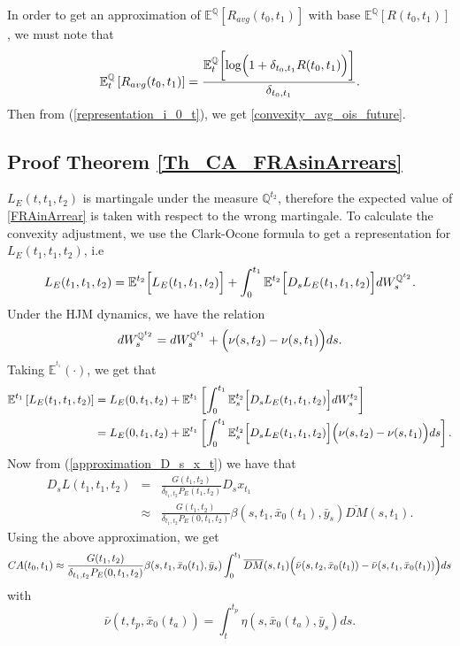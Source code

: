 \documentclass[a4paper,10pt]{article}
\newcommand{\1}{\mathbf{1}}
\begin{document}
In order to get an approximation of $\mathbb{E}^{\mathbb{Q}}\left[R_{avg}(t_0,t_1)\right]$ with base $\mathbb{E}^{\mathbb{Q}}\left[R(t_0,t_1)\right]$, we must note that 
\begin{equation*}
\mathbb{E}_t^{\mathbb{Q}}\left[R_{avg}(t_0,t_1)\right] = \frac{\mathbb{E}_t^{\mathbb{Q}}\biggl[ \log\Bigl(1+ \delta_{t_0,t_1} R(t_0,t_1)\Bigr)\biggr]}{ \delta_{t_0,t_1}}.
\end{equation*}
Then from (\ref{representation_i_0_t}), we get \eqref{convexity_avg_ois_future}.

\subsection{Proof Theorem \ref{Th_CA_FRAsinArrears}}\label{Proof_CA_FRAsinArrears}
$L_{E}(t,t_1,t_2)$ is martingale under the measure $\mathbb{Q}^{t_2}$, therefore the expected value of \eqref{FRAinArrear} is taken with respect to the wrong martingale. To calculate the convexity adjustment, we use the Clark-Ocone formula to get a representation for $L_{E}(t_1,t_1,t_2)$, i.e
\begin{equation}\label{general_convexity_fras}
L_{E}(t_1,t_1,t_2) = \mathbb{E}^{t_2}\Bigl[L_{E}(t_1,t_1,t_2) \Bigr] + \int_{0}^{t_1} \mathbb{E}^{t_2}\Bigl[D_s L_{E}(t_1,t_1,t_2) \Bigr] dW^{\mathbb{Q}^{t_2}}_{s}.
\end{equation}
Under the HJM dynamics, we have the relation
\begin{equation*}
dW^{\mathbb{Q}^{t_2}}_s = dW^{\mathbb{Q}^{t_1}}_s + \Bigl(\nu(s,t_2) - \nu(s,t_1)\Bigr) ds. 
\end{equation*}
Taking $\mathbb{E}^{^{t_1}}(\cdot)$, we get that
\begin{align*}
\mathbb{E}^{t_1}\left[L_{E}(t_1,t_1,t_2) \right] &= L_{E}(0,t_1,t_2) + \mathbb{E}^{t_1}\left[ \int_{0}^{t_1} \mathbb{E}_s^{t_2}\Bigl[D_s L_{E}(t_1,t_1,t_2)\Bigr] dW^{t_2}_{s}\right]\\
&= L_{E}(0,t_1,t_2) + \mathbb{E}^{t_1}\left[ \int_{0}^{t_1} \mathbb{E}_s^{t_2}\Bigl[D_s L_{E}(t_1,t_1,t_2) \Bigr] \Bigl(\nu(s,t_2)-\nu(s,t_1)\Bigr) ds \right].
\end{align*}
Now from (\ref{approximation_D_s_x_t}) we have that 
\begin{eqnarray*}
D_s L(t_1,t_1,t_2) &=& \frac{G(t_1,t_2)}{\delta_{t_1,t_2}P_{E}(t_1,t_2)} D_s x_{t_1}\\
&\approx& \frac{G(t_1,t_2)}{\delta_{t_1,t_2}P_{E}(0,t_1,t_2)} \beta(s,t_1, \bar{x}_0(t_1), \bar{y}_s)\overline{DM}(s,t_1).
\end{eqnarray*}
Using the above approximation, we get
\begin{equation*}
CA(t_0,t_1) \approx \frac{G(t_1,t_2)}{\delta_{t_1,t_2}P_{E}(0,t_1,t_2)} \beta(s,t_1, \bar{x}_0(t_1), \bar{y}_s) \int_{0}^{t_1} \overline{DM}(s,t_1) \Bigl(\bar{\nu}(s,t_2,\bar{x}_{0}(t_1))-\bar{\nu}(s,t_1,\bar{x}_{0}(t_1))\Bigr) ds
\end{equation*}
with 
\begin{equation*}
\bar{\nu}(t,t_p, \bar{x}_0(t_a))= \int_{t}^{t_p} \eta(s,\bar{x}_0(t_a),\bar{y}_s) ds.   
\end{equation*}
\end{document}

